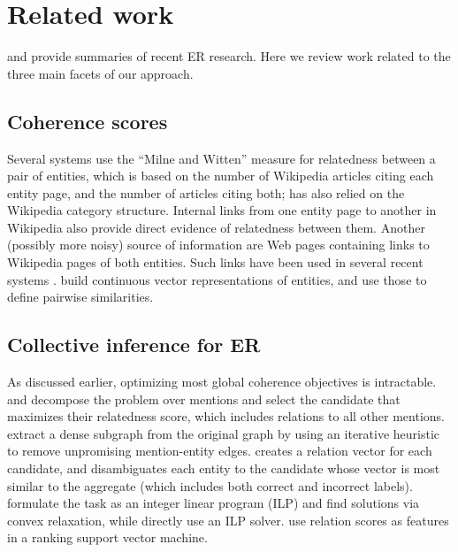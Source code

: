 \section{Related work}
\label{sec:related}

 and  provide
summaries of recent ER research.  Here we review work related to the
three main facets of our approach.


\subsection{Coherence scores}

Several systems \cite{Milne2008,KulkarniSRC09,Hoffart2011} use the
``Milne and Witten'' measure for relatedness between a pair of
entities, which is based on the number of Wikipedia articles citing
each entity page, and the number of articles citing both;
 has also relied on the Wikipedia category
structure.  Internal links from one entity page to another in
Wikipedia also provide direct evidence of relatedness between them.
Another (possibly more noisy) source of information are Web pages
containing links \cite{singh12:wiki-links} to Wikipedia pages of both
entities.  Such links have been used in several recent systems
\cite{ChengR13,Chisholm2015}.   build continuous
vector representations of entities, and use those to define pairwise
similarities. 


\subsection{Collective inference for ER}

As discussed earlier, optimizing most global coherence objectives is
intractable.  and  decompose
the problem over mentions and select the candidate that maximizes
their relatedness score, which includes relations to all other
mentions.   extract a dense subgraph from the
original graph by using an iterative heuristic to remove unpromising
mention-entity edges.  creates a relation vector
for each candidate, and disambiguates each entity to the candidate
whose vector is most similar to the aggregate (which includes both
correct and incorrect labels).  formulate the
task as an integer linear program (ILP) and find solutions via convex
relaxation, while  directly use an ILP solver.
 use relation scores as features in a ranking
support vector machine.

